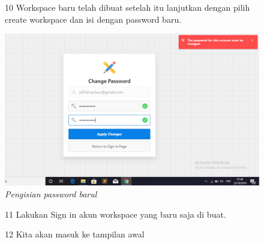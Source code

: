 \begin{enumerate}
\begin{figure}
\item[10] Workspace baru telah dibuat setelah itu lanjutkan dengan pilih create workspace dan isi dengan password baru.

    \begin{center}
\includegraphics[scale=0.5]{apex/apex5.png}
    \caption{\textit{Pengisian password barul}}
        \end{center}
\label{gambar}
\end{figure}

\begin{figure}
\item[11] Lakukan Sign in akun workspace yang baru saja di buat.

\end{figure}

\begin{figure}
\item[12] Kita akan masuk ke tampilan awal


\end{figure}
\end{enumerate}

